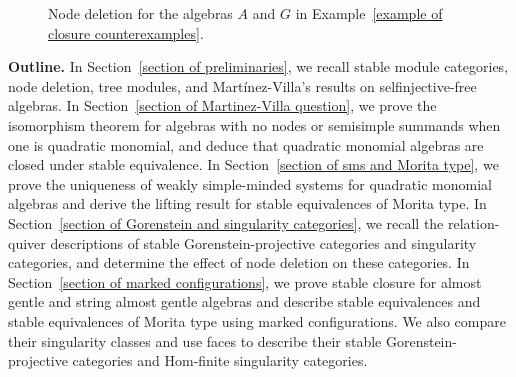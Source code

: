\documentclass[11pt]{article}
\newcommand{\vv}{\mathsf{v}}
\newcommand{\ww}{\mathsf{w}}
\theoremstyle{definition}
\begin{document}
\begin{figure}[htbp]
		\caption{Node deletion for the algebras $A$ and $G$ in Example~\ref{example of closure counterexamples}.}
		\label{figure of introductory node deletion}
	\end{figure}




	\medskip
	\noindent\textbf{Outline.}
	In Section~\ref{section of preliminaries}, we recall stable module categories, node deletion, tree modules, and Mart\'inez-Villa's results on selfinjective-free algebras.
	In Section~\ref{section of Martinez-Villa question}, we prove the isomorphism theorem for algebras with no nodes or semisimple summands when one is quadratic monomial, and deduce that quadratic monomial algebras are closed under stable equivalence.
	In Section~\ref{section of sms and Morita type}, we prove the uniqueness of weakly simple-minded systems for quadratic monomial algebras and derive the lifting result for stable equivalences of Morita type.
	In Section~\ref{section of Gorenstein and singularity categories}, we recall the relation-quiver descriptions of stable Gorenstein-projective categories and singularity categories, and determine the effect of node deletion on these categories.
	In Section~\ref{section of marked configurations}, we prove stable closure for almost gentle and string almost gentle algebras and describe stable equivalences and stable equivalences of Morita type using marked configurations.
	We also compare their singularity classes and use faces to describe their stable Gorenstein-projective categories and Hom-finite singularity categories.
\end{document}
